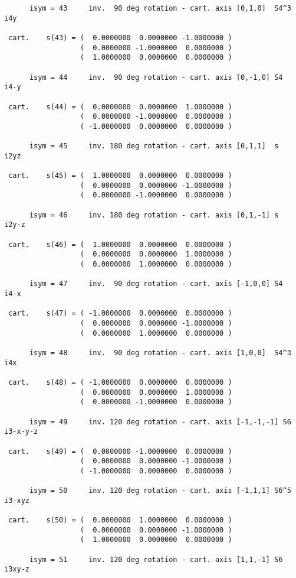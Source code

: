 \documentclass[12pt,a4paper]{article}
\begin{document}
\begin{footnotesize}
\begin{verbatim}
      isym = 43     inv.  90 deg rotation - cart. axis [0,1,0]  S4^3   i4y

 cart.    s(43) = (  0.0000000  0.0000000 -1.0000000 )
                  (  0.0000000 -1.0000000  0.0000000 )
                  (  1.0000000  0.0000000  0.0000000 )

      isym = 44     inv.  90 deg rotation - cart. axis [0,-1,0] S4     i4-y

 cart.    s(44) = (  0.0000000  0.0000000  1.0000000 )
                  (  0.0000000 -1.0000000  0.0000000 )
                  ( -1.0000000  0.0000000  0.0000000 )

      isym = 45     inv. 180 deg rotation - cart. axis [0,1,1]  s      i2yz

 cart.    s(45) = (  1.0000000  0.0000000  0.0000000 )
                  (  0.0000000  0.0000000 -1.0000000 )
                  (  0.0000000 -1.0000000  0.0000000 )

      isym = 46     inv. 180 deg rotation - cart. axis [0,1,-1] s      i2y-z

 cart.    s(46) = (  1.0000000  0.0000000  0.0000000 )
                  (  0.0000000  0.0000000  1.0000000 )
                  (  0.0000000  1.0000000  0.0000000 )

      isym = 47     inv.  90 deg rotation - cart. axis [-1,0,0] S4     i4-x

 cart.    s(47) = ( -1.0000000  0.0000000  0.0000000 )
                  (  0.0000000  0.0000000 -1.0000000 )
                  (  0.0000000  1.0000000  0.0000000 )

      isym = 48     inv.  90 deg rotation - cart. axis [1,0,0]  S4^3   i4x

 cart.    s(48) = ( -1.0000000  0.0000000  0.0000000 )
                  (  0.0000000  0.0000000  1.0000000 )
                  (  0.0000000 -1.0000000  0.0000000 )

      isym = 49     inv. 120 deg rotation - cart. axis [-1,-1,-1] S6   i3-x-y-z

 cart.    s(49) = (  0.0000000 -1.0000000  0.0000000 )
                  (  0.0000000  0.0000000 -1.0000000 )
                  ( -1.0000000  0.0000000  0.0000000 )

      isym = 50     inv. 120 deg rotation - cart. axis [-1,1,1] S6^5   i3-xyz

 cart.    s(50) = (  0.0000000  1.0000000  0.0000000 )
                  (  0.0000000  0.0000000 -1.0000000 )
                  (  1.0000000  0.0000000  0.0000000 )

      isym = 51     inv. 120 deg rotation - cart. axis [1,1,-1] S6     i3xy-z


\end{verbatim}
\end{footnotesize}
\end{document}
